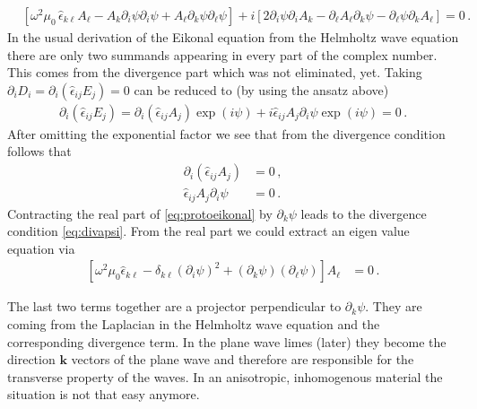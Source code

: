 \documentclass[12pt,a4paper,twoside,openright,BCOR10mm,headsepline,titlepage,abstracton,chapterprefix,final]{scrreprt}
\newcommand\Vector[1]{{\mathbf{#1}}}
\newcommand\Tensor[1]{\hat{#1}}
\newcommand\permittivity{\Tensor{\epsilon}}
\begin{document}
\begin{align}
    & \left[
    \omega^2 \mu_0\, \permittivity_{k\ell}A_\ell 
    -A_k \partial_i \psi \partial_i \psi
   +A_\ell \partial_k \psi \partial_\ell \psi
   \right] 
   +i \left[
    2\partial_i \psi \partial_i A_k
    -\partial_\ell A_\ell \partial_k \psi
    -\partial_\ell \psi \partial_k A_\ell
   \right] = 0\,.\label{eq:protoeikonal}
\end{align}
In the usual derivation of the Eikonal equation
from the Helmholtz wave equation there are only
two summands appearing in every part of the complex number.
This comes from the divergence part which was not eliminated, yet.
Taking $\partial_i D_i = \partial_i (\permittivity_{ij} E_j) = 0$ can be
reduced to (by using the ansatz above)
\begin{align}
 \partial_i (\permittivity_{ij} E_j) = \partial_i (\permittivity_{ij} A_j) \exp(i \psi) + i \permittivity_{ij} A_j \partial_i \psi \exp(i \psi) = 0\,.
\end{align}
After omitting the exponential factor we see that from the divergence condition follows that
\begin{align}
 \partial_i (\permittivity_{ij} A_j) &= 0\,,\label{eq:divaeps}\\
 \permittivity_{ij} A_j \partial_i \psi &= 0\,.\label{eq:divapsi}
\end{align}
Contracting the real part of \eqref{eq:protoeikonal} by $\partial_k \psi$ leads to the divergence condition \eqref{eq:divapsi}.
From the real part we could extract an eigen value equation via
\begin{align}
 \left[\omega^2 \mu_0 \permittivity_{k\ell} - \delta_{k\ell} (\partial_i \psi)^2 + (\partial_k \psi)(\partial_\ell \psi)\right] A_\ell  &= 0 \label{eq:anisoeikonal}\,.
\end{align}

The last two terms together are a projector perpendicular to $\partial_k \psi$. They are coming from
the Laplacian in the Helmholtz wave equation and the corresponding divergence term. In the plane wave limes (later)
they become the direction $\Vector{k}$ vectors of the plane wave and therefore are responsible for the transverse
property of the waves. In an anisotropic, inhomogenous material the situation is not that easy anymore.
\end{document}
